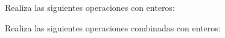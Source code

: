 \documentclass[spanish, 11pt]{exam}
\begin{document}
\begin{questions}
\begin{multicols}{2}
\end{multicols}


\question[2] Realiza las siguientes operaciones con enteros:
\begin{multicols}{2}
\end{multicols}


\question[4] Realiza las siguientes operaciones combinadas con enteros:

\end{questions}
\end{document}
